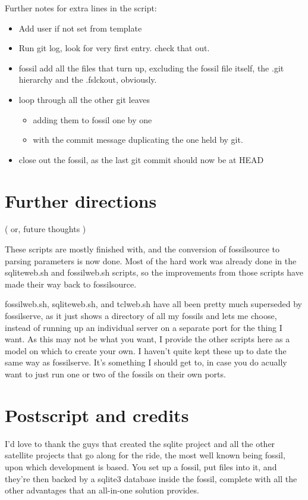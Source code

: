 \documentclass[11pt]{article}
\begin{document}
Further notes for extra lines in the script:
\begin{itemize}
\item Add user if not set from template
\item Run git log, look for very first entry. check that out.
\item fossil add all the files that turn up, excluding the fossil file itself, the .git hierarchy and the .fslckout, obviously.
\item loop through all the other git leaves
\begin{itemize}
\item adding them to fossil one by one
\item with the commit message duplicating the one held by git.
\end{itemize}
\item close out the fossil, as the last git commit should now be at HEAD
\end{itemize}

\section*{Further directions}
\label{sec:org50908c5}

( or, future thoughts )

These scripts are mostly finished with, and the conversion of fossilsource to parsing parameters is
now done. Most of the hard work was already done in the sqliteweb.sh and fossilweb.sh scripts, so
the improvements from those scripts have made their way back to fossilsource.

fossilweb.sh, sqliteweb.sh, and tclweb.sh have all been pretty much superseded by fossilserve, as it
just shows a directory of all my fossils and lets me choose, instead of running up an individual
server on a separate port for the thing I want. As this may not be what you want, I provide the
other scripts here as a model on which to create your own. I haven't quite kept these up to date the
same way as fossilserve. It's something I should get to, in case you do acually want to just run one
or two of the fossils on their own ports.

\section*{Postscript and credits}
\label{sec:orgdd7b7bd}

I'd love to thank the guys that created the sqlite project and all the other satellite projects that
go along for the ride, the most well known being fossil, upon which development is based. You set up
a fossil, put files into it, and they're then backed by a sqlite3 database inside the fossil,
complete with all the other advantages that an all-in-one solution provides.
\end{document}
